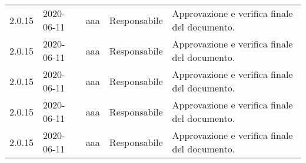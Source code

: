 {\begin{longtable}{c C{2.5cm} C{3.5cm} C{2.5cm} C{3.5cm}}
2.0.15 & 2020-06-11 & aaa & Responsabile & Approvazione e verifica finale del documento. \\
2.0.15 & 2020-06-11 & aaa & Responsabile & Approvazione e verifica finale del documento. \\
2.0.15 & 2020-06-11 & aaa & Responsabile & Approvazione e verifica finale del documento. \\
2.0.15 & 2020-06-11 & aaa & Responsabile & Approvazione e verifica finale del documento. \\
2.0.15 & 2020-06-11 & aaa & Responsabile & Approvazione e verifica finale del documento.\\
		
\end{longtable}
}